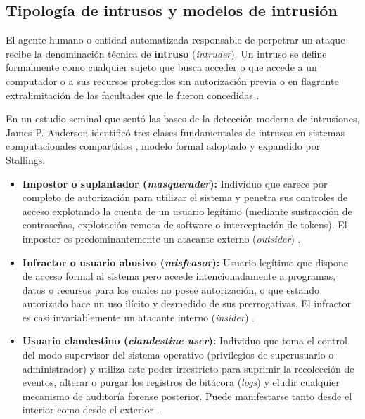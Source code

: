 \documentclass[12pt]{article}
\begin{document}
\subsection{Tipología de intrusos y modelos de intrusión}\label{subsec:tipologiaIntrusosModelosIntrusion}

El agente humano o entidad automatizada responsable de perpetrar un ataque recibe la denominación técnica de \textbf{intruso} (\textit{intruder}). Un intruso se define formalmente como cualquier sujeto que busca acceder o que accede a un computador o a sus recursos protegidos sin autorización previa o en flagrante extralimitación de las facultades que le fueron concedidas \parencite[\S 15.1, p.\ 659]{stallings2018operating}.

En un estudio seminal que sentó las bases de la detección moderna de intrusiones, James P. Anderson identificó tres clases fundamentales de intrusos en sistemas computacionales compartidos \parencite[\S 1, pp.\ 12--13]{anderson1980computer}, modelo formal adoptado y expandido por Stallings:
\begin{itemize}[noitemsep, topsep=2pt]
    \item \textbf{Impostor o suplantador (\textit{masquerader}):} Individuo que carece por completo de autorización para utilizar el sistema y penetra sus controles de acceso explotando la cuenta de un usuario legítimo (mediante sustracción de contraseñas, explotación remota de software o interceptación de tokens). El impostor es predominantemente un atacante externo (\textit{outsider}) \parencite[\S 15.1, p.\ 659]{stallings2018operating}.
    \item \textbf{Infractor o usuario abusivo (\textit{misfeasor}):} Usuario legítimo que dispone de acceso formal al sistema pero accede intencionadamente a programas, datos o recursos para los cuales no posee autorización, o que estando autorizado hace un uso ilícito y desmedido de sus prerrogativas. El infractor es casi invariablemente un atacante interno (\textit{insider}) \parencite[\S 1, p.\ 12]{anderson1980computer}.
    \item \textbf{Usuario clandestino (\textit{clandestine user}):} Individuo que toma el control del modo supervisor del sistema operativo (privilegios de superusuario o administrador) y utiliza este poder irrestricto para suprimir la recolección de eventos, alterar o purgar los registros de bitácora (\textit{logs}) y eludir cualquier mecanismo de auditoría forense posterior. Puede manifestarse tanto desde el interior como desde el exterior \parencite[\S 15.1, p.\ 660]{stallings2018operating}.
\end{itemize}
\end{document}

